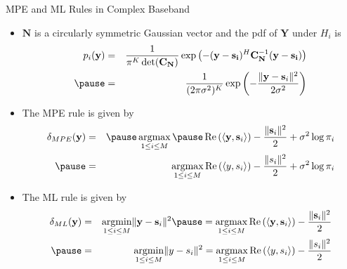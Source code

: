\documentclass[t]{beamer}
\newcommand{\argmax}{\operatornamewithlimits{argmax}}
\newcommand{\argmin}{\operatornamewithlimits{argmin}}
\renewcommand\Re{\operatorname{Re}}
\begin{document}
\begin{frame}{MPE and ML Rules in Complex Baseband}
  \footnotesize
  \begin{itemize}
    \item \pause $\mathbf{N}$ is a circularly symmetric Gaussian vector \pause and the pdf of $\mathbf{Y}$ under $H_i$ is
      \begin{eqnarray*}
        p_i(\mathbf{y}) & = & \frac{1}{\pi^K\det(\mathbf{C}_{\mathbf{N}})} \exp\left(-(\mathbf{y}-\mathbf{s_i})^H\mathbf{C}_{\mathbf{N}}^{-1}(\mathbf{y}-\mathbf{s_i})\right) \\ \pause
                        & = & \frac{1}{(2\pi \sigma^2)^K} \exp\left( -\frac{\lVert \mathbf{y} - \mathbf{s}_i\rVert^2}{2\sigma^2}\right)
      \end{eqnarray*}
    \item \pause The MPE rule is given by
      \begin{eqnarray*}
        \delta_{MPE}(\mathbf{y}) & = & \pause \argmax_{1 \leq i \leq M} \pause \Re \left( \langle \mathbf{y}, \mathbf{s}_i \rangle \right) - \frac{\lVert \mathbf{s}_i \rVert^2}{2} + \sigma^2 \log \pi_i \\ \pause
                                 & = & \argmax_{1 \leq i \leq M} \Re \left( \langle y, s_i \rangle \right) - \frac{\lVert s_i \rVert^2}{2}+ \sigma^2 \log \pi_i 
      \end{eqnarray*}
    \item \pause The ML rule is given by
      \begin{eqnarray*}
        \delta_{ML}(\mathbf{y}) & = & \argmin_{1 \leq i \leq M} \lVert \mathbf{y} - \mathbf{s}_i \rVert^2 \pause = \argmax_{1 \leq i \leq M} \Re \left( \langle \mathbf{y}, \mathbf{s}_i \rangle \right) - \frac{\lVert \mathbf{s}_i \rVert^2}{2}  \\ \pause 
                                & = & \argmin_{1 \leq i \leq M} \lVert y - s_i \rVert^2 = \argmax_{1 \leq i \leq M} \Re \left( \langle y, s_i \rangle \right) - \frac{\lVert s_i \rVert^2}{2}
      \end{eqnarray*}
  \end{itemize}
  \normalsize
\end{frame}
\end{document}
